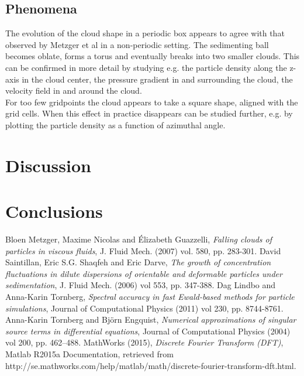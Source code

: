 \documentclass[a4paper,twoside=false,abstract=false,numbers=noenddot,
titlepage=false,headings=small,parskip=half,version=last]{scrartcl}
\begin{document}
\subsection{Phenomena}
The evolution of the cloud shape in a periodic box appears to agree with that observed by Metzger et al \cite{fallingclouds} in a non-periodic setting. The sedimenting ball becomes oblate, forms a torus and eventually breaks into two smaller clouds. This can be confirmed in more detail by studying e.g. the particle density along the z-axis in the cloud center, the pressure gradient in and surrounding the cloud, the velocity field in and around the cloud.\\
For too few gridpoints the cloud appears to take a square shape, aligned with the grid cells. When this effect in practice disappears can be studied further, e.g. by plotting the particle density as a function of azimuthal angle.\\

\section{Discussion}

\section{Conclusions}

\begin{thebibliography}{1}
		Bloen Metzger, Maxime Nicolas and Élizabeth Guazzelli,
		{\em Falling clouds of particles in viscous fluids},
		J. Fluid Mech. (2007) vol. 580, pp. 283-301.
        David Saintillan, Eric S.G. Shaqfeh and Eric Darve,
        {\em The growth of concentration fluctuations in dilute dispersions of orientable and deformable particles under sedimentation},
        J. Fluid Mech. (2006) vol 553, pp. 347-388.
        Dag Lindbo and Anna-Karin Tornberg,
        {\em Spectral accuracy in fast Ewald-based methods for particle simulations},
        Journal of Computational Physics (2011) vol 230, pp. 8744-8761.
        Anna-Karin Tornberg and Björn Engquist,
        {\em Numerical approximations of singular source terms
in differential equations},
        Journal of Computational Physics (2004) vol 200, pp. 462–488.
        MathWorks (2015),
        {\em Discrete Fourier Transform (DFT)},
        Matlab R2015a Documentation, retrieved from http://se.mathworks.com/help/matlab/math/discrete-fourier-transform-dft.html.
	
\end{thebibliography}
\end{document}
